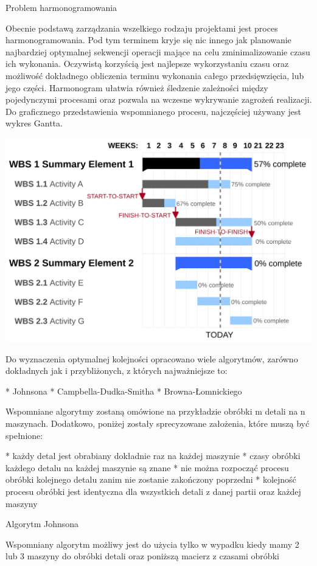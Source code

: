 Problem harmonogramowania

Obecnie podstawą zarządzania wszelkiego rodzaju projektami jest proces harmonogramowania. Pod tym terminem kryje się nic innego jak planowanie najbardziej optymalnej sekwencji operacji mające na celu zminimalizowanie czasu ich wykonania. Oczywistą korzyścią jest najlepsze wykorzystaniu czasu oraz możliwość dokładnego obliczenia terminu wykonania całego przedsięwzięcia, lub jego części. Harmonogram ułatwia również śledzenie zależności między pojedynczymi procesami oraz pozwala na wczesne wykrywanie zagrożeń realizacji. Do graficznego przedstawienia wspomnianego procesu, najczęściej używany jest wykres Gantta. 

\includegraphics{Grafika/wykres-gantt.svg}

Do wyznaczenia optymalnej kolejności opracowano wiele algorytmów, zarówno dokładnych jak i przybliżonych, z których najważniejsze to:

* Johnsona
* Campbella-Dudka-Smitha
* Browna-Łomnickiego

Wspomniane algorytmy zostaną omówione na przykładzie obróbki m detali na n maszynach. Dodatkowo, poniżej zostały sprecyzowane założenia, które muszą być spełnione:

* każdy detal jest obrabiany dokładnie raz na każdej maszynie
* czasy obróbki każdego detalu na każdej maszynie są znane
* nie można rozpocząć procesu obróbki kolejnego detalu zanim nie zostanie zakończony poprzedni
* kolejność procesu obróbki jest identyczna dla wszystkich detali z danej partii oraz każdej maszyny
 
Algorytm Johnsona

Wspomniany algorytm możliwy jest do użycia tylko w wypadku kiedy mamy 2 lub 3 maszyny do obróbki detali oraz poniższą macierz z czasami obróbki 

